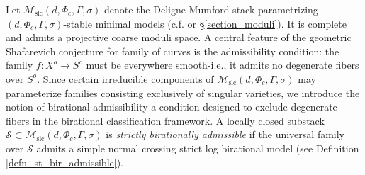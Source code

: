 \documentclass[11pt,letterpaper]{amsart}
\numberwithin{equation}{section}
\begin{document}
	Let $\mathcal{M}_{\mathrm{slc}}(d, \Phi_c, \Gamma, \sigma)$ denote the Deligne-Mumford stack parametrizing $(d, \Phi_c, \Gamma, \sigma)$-stable minimal models (c.f. \cite{Birkar2022} or \S \ref{section_moduli}). It is complete and admits a projective coarse moduli space. A central feature of the geometric Shafarevich conjecture for family of curves is the admissibility condition: the family $f \colon X^o \to S^o$ must be everywhere smooth-i.e., it admits no degenerate fibers over $S^o$. Since certain irreducible components of $\mathcal{M}_{\mathrm{slc}}(d, \Phi_c, \Gamma, \sigma)$ may parameterize families consisting exclusively of singular varieties, we introduce the notion of birational admissibility-a condition designed to exclude degenerate fibers in the birational classification framework. A locally closed substack $\mathcal{S} \subset \mathcal{M}_{\mathrm{slc}}(d, \Phi_c, \Gamma, \sigma)$ is \emph{strictly birationally admissible} if the universal family over $\mathcal{S}$ admits a simple normal crossing strict log birational model (see Definition \ref{defn_st_bir_admissible}).
	
\end{document}
